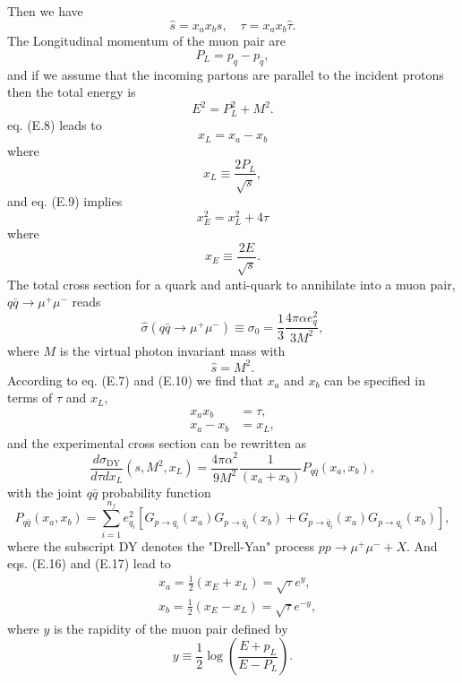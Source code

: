 Then we have 
\begin{equation}
\hat{s}=x_ax_bs, \quad \tau=x_ax_b\hat{\tau}.
\end{equation}
The Longitudinal momentum of the muon pair are 
\begin{equation}
P_L=p_q-p_{\bar{q}},
\end{equation}
and if we assume that the incoming partons are parallel to the incident protons then the total energy is 
\begin{equation}
E^2=P^2_L+M^2.
\end{equation}
eq. (E.8) leads to 
\begin{equation}
x_L=x_a-x_b
\end{equation}
where 
\begin{equation}
x_L\equiv \frac{2P_L}{\sqrt{s}},
\end{equation}
and eq. (E.9) implies
\begin{equation}
x^2_E=x^2_L+4\tau
\end{equation}
where
\begin{equation}
x_E\equiv\frac{2E}{\sqrt{s}}.
\end{equation}
The total cross section for a quark and anti-quark to annihilate into a muon pair, $q\bar{q}\to\mu^+\mu^-$ reads
\begin{equation}
\hat{\sigma}(q\bar{q}\to\mu^+\mu^-)\equiv\sigma_0=\frac{1}{3}\frac{4\pi\alpha e^2_q}{3M^2},
\end{equation}
where $M$ is the virtual photon invariant mass with 
\begin{equation}
\hat{s}=M^2.
\end{equation}
According to eq. (E.7) and (E.10) we find that $x_a$ and $x_b$ can be specified in terms of $\tau$ and $x_L$,
\begin{align}
x_ax_b&=\tau,\\
x_a-x_b&=x_L,
\end{align}
and the experimental cross section can be rewritten as
\begin{equation}
\frac{d\sigma_\text{DY}}{d\tau dx_L}(s,M^2,x_L)=\frac{4\pi\alpha^2}{9M^2}\frac{1}{(x_a+x_b)}P_{q\bar{q}}(x_a,x_b),
\end{equation}
with the joint $q\bar{q}$ probability function
\begin{equation}
P_{q\bar{q}}(x_a,x_b)=\sum_{i=1}^{n_f}e^2_{q_i}[G_{p\to q_i}(x_a)G_{p\to \bar{q}_i}(x_b)+G_{p\to \bar{q}_i}(x_a)G_{p\to q_i}(x_b)],
\end{equation}
where the subscript DY denotes the "Drell-Yan" process $pp\to \mu^+\mu^-+X$. And eqs. (E.16) and (E.17) lead to 
\begin{align}
&x_a=\frac{1}{2}(x_E+x_L)=\sqrt{\tau}e^y,\\
&x_b=\frac{1}{2}(x_E-x_L)=\sqrt{\tau}e^{-y},
\end{align}
where $y$ is the rapidity of the muon pair defined by
\begin{equation}
y\equiv\frac{1}{2}\log\left(\frac{E+p_L}{E-P_L}\right).
\end{equation}

